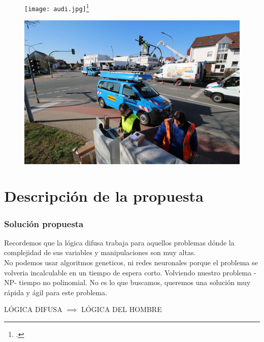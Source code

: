 \documentclass[
	11pt, %
]{beamer}
\begin{document}
\begin{frame}
  \begin{figure}
    \texttt{[image: audi.jpg]}\footcite{audi}
  \end{figure}
\end{frame}

\begin{frame}
  
  \begin{figure}
    \includegraphics[width=0.8\linewidth]{street_code.jpeg}
  \end{figure}
  
    
\end{frame}

\section{Descripción de la propuesta}
\begin{frame}
  \frametitle{Solución propuesta}
  
  Recordemos que la lógica difusa trabaja para aquellos problemas dónde la complejidad de sus variables y manipulaciones son muy altas. \\

  No podemos usar algoritmos geneticos, ni redes neuronales porque el problema se volveria incalculable en un tiempo de espera corto. Volviendo nuestro problema -NP- tiempo no polinomial. No es lo que buscamos, queremos una solución muy rápida y ágil para este problema.\\
  \bigskip %
  \begin{center}
    LÓGICA DIFUSA $\implies$ LÓGICA DEL HOMBRE
  \end{center}
      
\end{frame}
\end{document}
